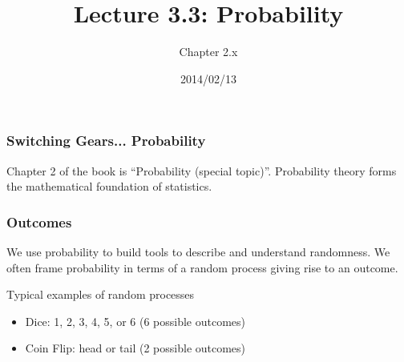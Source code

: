 \documentclass[slides]{beamer}
\title{Lecture 3.3: Probability}
\author{Chapter 2.x}
\date{2014/02/13}
\newcommand{\blue}[1]{\textcolor{blue2}{#1}}
\begin{document}
\begin{frame}
\titlepage
\end{frame}


\begin{frame}[fragile]
\frametitle{Switching Gears... Probability}

Chapter 2 of the book is ``Probability (special topic)''.    Probability theory forms the mathematical foundation of statistics.  

%


\end{frame}



\begin{frame}[fragile]
\frametitle{Outcomes}
We use probability to build tools to describe and understand randomness.  We often frame probability in terms of a \blue{random process} giving rise to an \blue{outcome}.  

\vspace{0.5cm}

\pause Typical examples of random processes
\begin{itemize}
\pause \item Dice: 1, 2, 3, 4, 5, or 6 (6 possible outcomes)
\pause \item Coin Flip: head or tail (2 possible outcomes)
\end{itemize}

\end{frame}
\end{document}
